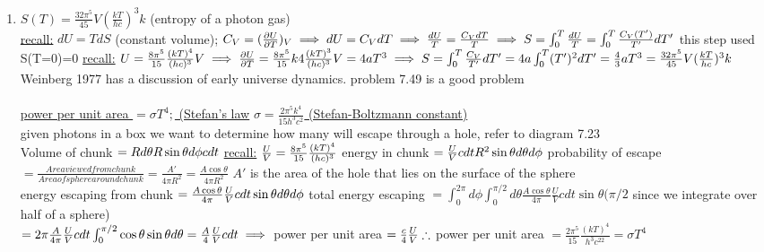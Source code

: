 \documentclass[12pt]{amsart}
\begin{document}
\begin{enumerate}
\hdashrule[0.5ex][c]{\linewidth}{0.5pt}{1.5mm}\\


\item \underline{$S(T) = \frac{32 \pi^5}{45} V (\frac{kT}{hc})^3 k$} (entropy of a photon gas)\\
\underline{recall:} $dU=T dS$ (constant volume);$\,\, C_V = ( \frac{\partial U}{\partial T} )_V \implies dU = C_V dT\\
\implies \frac{dU}{T} = \frac{C_V dT}{T}\\
\implies S = \int_0 ^T \frac{dU}{T} = \int_0^T \frac{C_V(T')}{T'} dT'\\$ this step used S(T=0)=0
\underline{recall:} $U= \frac{8 \pi^5}{15} \frac{(kT)^4}{(hc)^3} V\\
\implies \frac{\partial U}{\partial T} = \frac{8 \pi^5}{15} k 4 \frac{(kT)^3}{(hc)^3} V = 4 a T^3\\
\implies S = \int_0^T \frac{C_V}{T'} d T' = 4 a \int_0^T (T')^2 d T' = \frac{4}{3} a T^3\\
= \frac{32 \pi^5}{45} V (\frac{kT}{hc})^3 k\\$
Weinberg 1977 has a discussion of early universe dynamics. problem 7.49 is a good problem\\


\hdashrule[0.5ex][c]{\linewidth}{0.5pt}{1.5mm}\\


\underline{power per unit area $= \sigma T^4;$ (Stefan's law$\,\, \sigma = \frac{2 \pi^5 k^4}{15 h^3 c^2}$ (Stefan-Boltzmann constant)}\\
given photons in a box we want to determine how many will escape through a hole, refer to diagram 7.23\\
Volume of chunk $= R d \theta R \sin \theta d \phi c dt\\$
\underline{recall:} $\frac{U}{V} = \frac{8 \pi^5}{15} \frac{(kT)^4}{(hc)^3}\\$
energy in chunk $= \frac{U}{V} c dt R^2 \sin \theta d \theta d \phi\\$
probability of escape $= \frac{Area viewed from chunk}{Area of sphere around chunk}= \frac{A'}{4 \pi R^2} = \frac{A \cos \theta}{4 \pi R^2}$ $A'$ is the area of the hole that lies on the surface of the sphere \\
energy escaping from chunk $= \frac{A \cos \theta}{4 \pi} \frac{U}{V} c dt \sin \theta  d \theta d \phi\\$
total energy escaping $= \int_0^{2 \pi} d \phi \int_0^{\pi/2} d \theta \frac{A \cos \theta}{4 \pi} \frac{U}{V} c dt \sin \theta (\pi/2$ since we integrate over half of a sphere)\\
$= 2 \pi \frac{A}{4 \pi} \frac{U}{V} c dt \int_0^{\pi/2} \cos \theta \sin \theta d \theta = \frac{A}{4} \frac{U}{V} c dt\\
\implies$ power per unit area $= \frac{c}{4} \frac{U}{V}\\
\therefore$ power per unit area $= \frac{2 \pi^5}{15} \frac{(kT)^4}{h^3 c^22} = \sigma T^4$



\end{enumerate}
\end{document}
